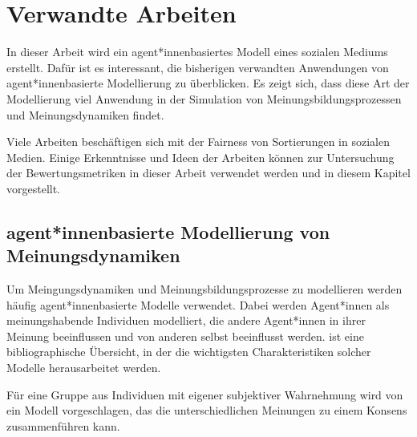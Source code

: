 \chapter{Verwandte Arbeiten}


In dieser Arbeit wird ein agent*innenbasiertes Modell eines sozialen Mediums erstellt. Dafür ist es interessant, die bisherigen verwandten Anwendungen von agent*innenbasierte Modellierung zu überblicken. Es zeigt sich, dass diese Art der Modellierung viel Anwendung in der Simulation von Meinungsbildungsprozessen und Meinungsdynamiken findet.

Viele Arbeiten beschäftigen sich mit der Fairness von Sortierungen in sozialen Medien. Einige Erkenntnisse und Ideen der Arbeiten können zur Untersuchung der Bewertungsmetriken in dieser Arbeit verwendet werden und in diesem Kapitel vorgestellt.

\section{agent*innenbasierte Modellierung von Meinungsdynamiken}

Um Meingungsdynamiken und Meinungsbildungsprozesse zu modellieren werden häufig agent*innenbasierte Modelle verwendet. Dabei werden Agent*innen als meinungshabende Individuen modelliert, die andere Agent*innen in ihrer Meinung beeinflussen und von anderen selbst beeinflusst werden. \cite{Mastroeni201958836} ist eine bibliographische Übersicht, in der die wichtigsten Charakteristiken solcher Modelle herausarbeitet werden.


Für eine Gruppe aus Individuen mit eigener subjektiver Wahrnehmung wird von \cite{Degroot1974118} ein Modell vorgeschlagen, das die unterschiedlichen Meinungen zu einem Konsens zusammenführen kann.

